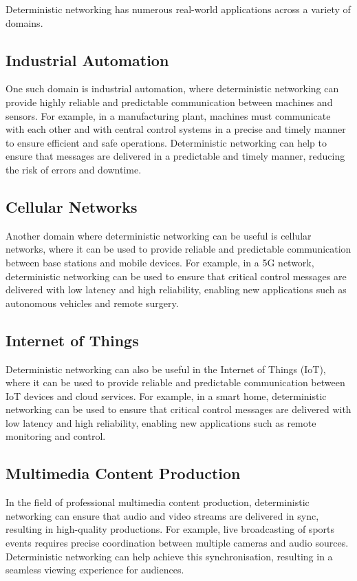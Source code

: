 \documentclass[runningheads]{llncs}
\begin{document}
Deterministic networking has numerous real-world applications across a variety of domains.

\subsection*{Industrial Automation}
One such domain is industrial automation, where deterministic networking can provide highly reliable and predictable communication between machines and sensors. For example, in a manufacturing plant, machines must communicate with each other and with central control systems in a precise and timely manner to ensure efficient and safe operations. Deterministic networking can help to ensure that messages are delivered in a predictable and timely manner, reducing the risk of errors and downtime.

\subsection*{Cellular Networks}
Another domain where deterministic networking can be useful is cellular networks, where it can be used to provide reliable and predictable communication between base stations and mobile devices. For example, in a 5G network, deterministic networking can be used to ensure that critical control messages are delivered with low latency and high reliability, enabling new applications such as autonomous vehicles and remote surgery.

\subsection*{Internet of Things}
Deterministic networking can also be useful in the Internet of Things (IoT), where it can be used to provide reliable and predictable communication between IoT devices and cloud services. For example, in a smart home, deterministic networking can be used to ensure that critical control messages are delivered with low latency and high reliability, enabling new applications such as remote monitoring and control.

\subsection*{Multimedia Content Production}
In the field of professional multimedia content production, deterministic networking can ensure that audio and video streams are delivered in sync, resulting in high-quality productions. For example, live broadcasting of sports events requires precise coordination between multiple cameras and audio sources. Deterministic networking can help achieve this synchronisation, resulting in a seamless viewing experience for audiences.
\end{document}
